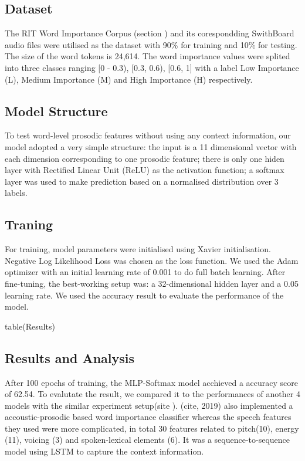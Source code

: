  \subsection{Dataset}
 The RIT Word Importance Corpus (section   ) and its corespondding SwithBoard audio files were utilised as the dataset with 90\% for training and 10\% for testing. The size of the word tokens is 24,614. The word importance values were splited into three classes ranging [0 - 0.3), [0.3, 0.6), [0.6, 1] with a label Low Importance (L), Medium Importance (M) and High Importance (H) respectively. 
 
  \subsection{Model Structure}
  To test word-level prosodic features without using any context information, our model adopted a very simple structure: the input is a 11 dimensional vector with each dimension corresponding to one prosodic feature; there is only one hiden layer with Rectified Linear Unit (ReLU) as the activation function; a softmax layer was used to make prediction based on a normalised distribution over 3 labels.
 
 \subsection{Traning}
 For training, model parameters were initialised using Xavier initialisation. Negative Log Likelihood Loss was chosen as the loss function. We used the Adam optimizer with an initial learning rate of 0.001 to do full batch learning. After fine-tuning, the best-working setup was: a 32-dimensional hidden layer and a 0.05 learning rate. We used the accuracy result to evaluate the performance of the model. 
 
 table(Results)
 
 \subsection{Results and Analysis}
After 100 epochs of training, the MLP-Softmax model acchieved a accuracy score of 62.54. To evalutate the result, we compared it to the performances of another 4 models with the similar experiment setup(site ). (cite, 2019) also implemented a accoustic-prosodic based word importance classifier whereas the speech features they used were more complicated, in total 30 features related to pitch(10), energy (11), voicing (3) and spoken-lexical elements (6). It was a sequence-to-sequence model using LSTM to capture the context information.

